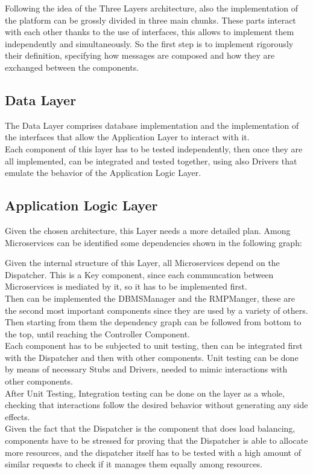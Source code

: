Following the idea of the Three Layers architecture, also the implementation of the platform can be grossly divided in three main chunks.
These parts interact with each other thanks to the use of interfaces, this allows to implement them independently and simultaneously. So the first step is to implement rigorously their definition, specifying how messages are composed and how they are exchanged between the components.\\

\subsection{Data Layer}
The Data Layer comprises database implementation and the implementation of the interfaces that allow the Application Layer to interact with it.\\
Each component of this layer has to be tested independently, then once they are all implemented, can be integrated and tested together, using also Drivers that emulate the behavior of the Application Logic Layer.\\
\subsection{Application Logic Layer}
Given the chosen architecture, this Layer needs a more detailed plan. Among Microservices can be identified some dependencies shown in the following graph:


Given the internal structure of this Layer, all Microservices depend on the Dispatcher. This is a Key component, since each communcation between Microservices is mediated by it, so it has to be implemented first.\\
Then can be implemented the DBMSManager and the RMPManger, these are the second most important components since they are used by a variety of others. Then starting from them the dependency graph can be followed from bottom to the top, until reaching the Controller Component.\\
Each component has to be subjected to unit testing, then can be integrated first with the Dispatcher and then with other components. Unit testing can be done by means of necessary Stubs and Drivers, needed to mimic interactions with other components.\\
After Unit Testing, Integration testing can be done on the layer as a whole, checking that interactions follow the desired behavior without generating any side effects.\\
Given the fact that the Dispatcher is the component that does load balancing, components have to be stressed for proving that the Dispatcher is able to allocate more resources, and the dispatcher itself has to be tested with a high amount of similar requests to check if it manages them equally among resources.\\

